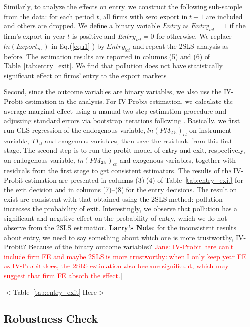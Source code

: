 \documentclass[12pt]{article}
\begin{document}
Similarly, to analyze the effects on entry, we construct the following
sub-sample from the data: for each period $t$, all firms with zero export in 
$t-1$ are included and others are dropped. We define a binary variable $%
Entry $ as $Entry_{ict}=1$ if the firm's export in year $t$ is positive and $%
Entry_{ict}=0$ for otherwise. We replace $ln(Export_{ict})$ in Eq.(\ref{equ1}%
) by $Entry_{ict}$ and repeat the 2SLS analysis as before. The estimation
results are reported in columns (5) and (6) of Table~\ref{tab:entry_exit}. We find that
pollution does not have statistically significant effect on firms' entry to
the export markets.

Second, since the outcome variables are binary variables, we also use the
IV-Probit estimation in the analysis. For IV-Probit estimation, we calculate the 
average marginal effect using a manual two-step estimation procedure and adjusting standard errors via bootstrap iterations 
following \citep{wooldridge2010econometric}. Basically, we
first run OLS regression of the endogenous variable, $ln(PM_{2.5})_{ct}$ on
instrument variable, $TI_{ct}$ and exogenous variables, then
save the residuals from this first stage. The second step is to run the probit
model of entry and exit, respectively, on endogenous variable, $ln(PM_{2.5})_{ct}$ and exogenous variables, together with residuals from the first stage to get consistent estimators. 
The results of the IV-Probit estimation are presented in columns (3)-(4) of Table~\ref{tab:entry_exit} for the exit decision and in 
columns (7)--(8) for the entry decisions. The result on exist are consistent with that obtained using the 2SLS method: pollution increases the probability of exit. Interestingly, we observe that pollution has a significant and negative effect on the probability of entry, which we do not observe from the 2SLS estimation. \lbrack \textbf{Larry's Note}: for the inconsistent results about entry, we
need to say something about which one is more trustworthy, IV-Probit? Because
of the binary outcome variables? \textcolor{red}{Jane: IV-Probit here can't include firm FE and maybe 2SLS is more trustworthy: when I only keep year FE as IV-Probit does, the 2SLS estimation also become significant, which may suggest that firm FE absorb the effect.}]

\begin{center}
  $<$Table~\ref{tab:entry_exit} Here$>$
\end{center}

\subsection{Robustness Check}
\end{document}
